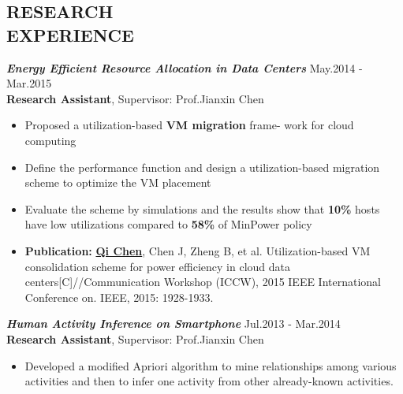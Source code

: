 \documentclass[line,margin]{res}
\begin{document}
\begin{resume}
\section{RESEARCH \\ EXPERIENCE}
        {\sl \textbf{Energy Efficient Resource Allocation in Data Centers}} \hfill May.2014 - Mar.2015 \\[1mm]
        \vspace{0.1mm}
        \quad \textbf{Research Assistant}, Supervisor: Prof.Jianxin Chen
         \vspace{1mm}
        \begin{itemize}
            \item Proposed a utilization-based \textbf{VM migration} frame- work for cloud computing
	\item Define the performance function and design a utilization-based migration scheme to optimize the VM placement
	\item Evaluate the scheme by simulations and the results show that \textbf{10\%} hosts have low utilizations compared to \textbf{58\%} of MinPower policy
\item \textbf{Publication:} \underline{\textbf{Qi Chen}}, Chen J, Zheng B, et al. Utilization-based VM consolidation scheme for power efficiency in cloud data centers[C]//Communication Workshop (ICCW), 2015 IEEE International Conference on. IEEE, 2015: 1928-1933.
        \end{itemize}
        \vspace{-2mm}
        {\sl {\textbf{Human Activity Inference on Smartphone}}} \hfill Jul.2013 - Mar.2014 \\[1mm]
         \vspace{0.1mm}
        \quad \textbf{Research Assistant}, Supervisor: Prof.Jianxin Chen
        \begin{itemize}
        \vspace{1mm}
              \item Developed a modified Apriori algorithm to mine  relationships among various activities and then to infer one activity from other already-known activities.
             
        \end{itemize}


\end{resume}
\end{document}
